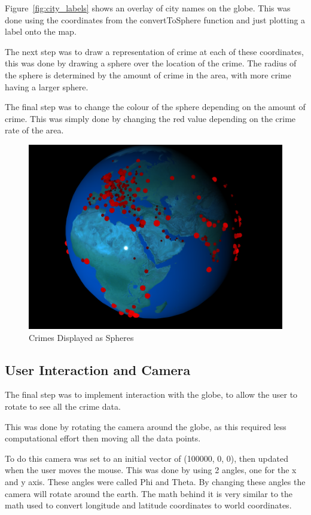\documentclass[]{article}
\begin{document}
Figure~\ref{fig:city_labels} shows an overlay of city names on the globe.
This was done using the coordinates from the convertToSphere function and just plotting a label onto the map.

The next step was to draw a representation of crime at each of these coordinates,
this was done by drawing a sphere over the location of the crime.
The radius of the sphere is determined by the amount of crime in the area,
with more crime having a larger sphere.

The final step was to change the colour of the sphere depending on the amount of crime.
This was simply done by changing the red value depending on the crime rate of the area.

\begin{figure}[H]
   \centering
   \includegraphics[width=0.8\linewidth]{images/crime_spheres}
   \caption{Crimes Displayed as Spheres}
   \label{fig:crime_spheres}
\end{figure}

\subsection{User Interaction and Camera}

The final step was to implement interaction with the globe, 
to allow the user to rotate to see all the crime data.

This was done by rotating the camera around the globe,
as this required less computational effort then moving all the data points.

To do this camera was set to an initial vector of (100000, 0, 0),
then updated when the user moves the mouse.
This was done by using 2 angles, one for the x and y axis.
These angles were called Phi and Theta.
By changing these angles the camera will rotate around the earth.
The math behind it is very similar to the math used to convert longitude
and latitude coordinates to world coordinates.
\end{document}
